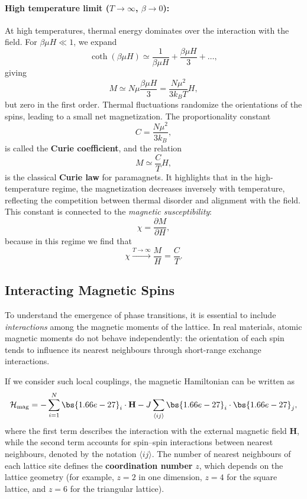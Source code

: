 \paragraph{High temperature limit ($T \to \infty$, $\beta \to 0$):}
At high temperatures, thermal energy dominates over the interaction with the field. For $\beta \mu H \ll 1$, we expand
\[
    \coth(\beta \mu H) \simeq \frac{1}{\beta \mu H} + \frac{\beta \mu H}{3} + \dots,
\]
giving
\[
    M \simeq N \mu \frac{\beta \mu H}{3} = \frac{N \mu^2}{3 k_B T} H,
\]
but zero in the first order.
Thermal fluctuations randomize the orientations of the spins, leading to a small net magnetization. The proportionality constant
\begin{equation}
    C = \frac{N \mu^2}{3 k_B},
    \label{eq:curie_coefficient}
\end{equation}
is called the \textbf{Curie coefficient}, and the relation
\begin{equation}
    M \simeq \frac{C}{T} H,
    \label{eq:curie_law}
\end{equation}
is the classical \textbf{Curie law} for paramagnets. It highlights that in the high-temperature regime, the magnetization decreases inversely with temperature, reflecting the competition between thermal disorder and alignment with the field. This constant is connected to the \textit{magnetic susceptibility}:
\begin{equation}
    \chi = \frac{\partial M}{\partial H},
    \label{eq:magnetic_susceptibility_definition}
\end{equation}
because in this regime we find that
\[
    \chi \xrightarrow{T \to \infty} \frac{M}{H} = \frac{C}{T}.
\]

\subsection{Interacting Magnetic Spins}

To understand the emergence of phase transitions, it is essential to include \textit{interactions} among the magnetic moments of the lattice. In real materials, atomic magnetic moments do not behave independently: the orientation of each spin tends to influence its nearest neighbours through short-range exchange interactions.

If we consider such local couplings, the magnetic Hamiltonian can be written as
\[
    \mathcal{H}_{\mathrm{mag}} = -\sum_{i=1}^N \bs{\mu}_i \cdot \mathbf{H}
    - J \sum_{\langle ij \rangle} \bs{\mu}_i \cdot \bs{\mu}_j,
\]
where the first term describes the interaction with the external magnetic field \(\mathbf{H}\), while the second term accounts for spin–spin interactions between nearest neighbours, denoted by the notation \(\langle ij \rangle\).
The number of nearest neighbours of each lattice site defines the \textbf{coordination number} \(z\), which depends on the lattice geometry (for example, \(z=2\) in one dimension, \(z=4\) for the square lattice, and \(z=6\) for the triangular lattice).

